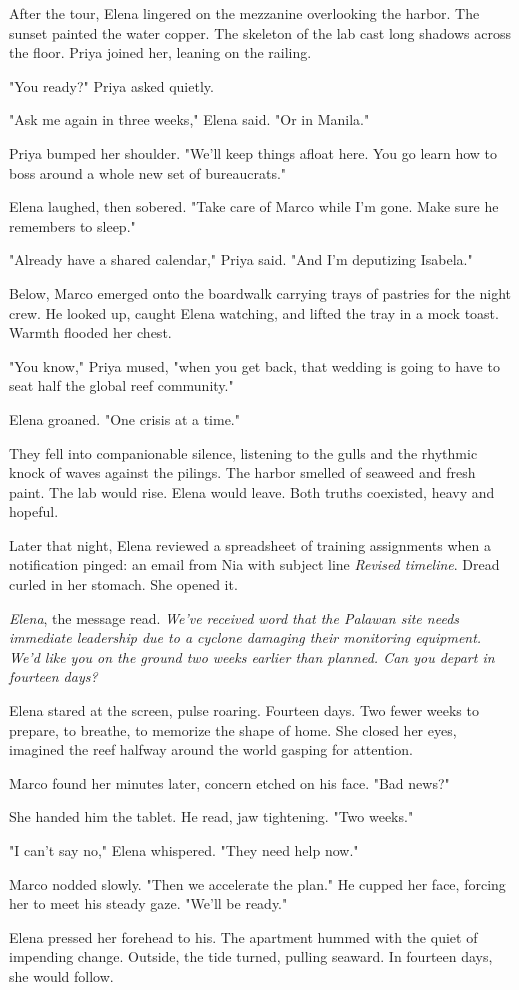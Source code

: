 After the tour, Elena lingered on the mezzanine overlooking the harbor. The sunset painted the water copper. The skeleton of the lab cast long shadows across the floor. Priya joined her, leaning on the railing.

"You ready?" Priya asked quietly.

"Ask me again in three weeks," Elena said. "Or in Manila."

Priya bumped her shoulder. "We'll keep things afloat here. You go learn how to boss around a whole new set of bureaucrats."

Elena laughed, then sobered. "Take care of Marco while I'm gone. Make sure he remembers to sleep."

"Already have a shared calendar," Priya said. "And I'm deputizing Isabela."

Below, Marco emerged onto the boardwalk carrying trays of pastries for the night crew. He looked up, caught Elena watching, and lifted the tray in a mock toast. Warmth flooded her chest.

"You know," Priya mused, "when you get back, that wedding is going to have to seat half the global reef community."

Elena groaned. "One crisis at a time."

They fell into companionable silence, listening to the gulls and the rhythmic knock of waves against the pilings. The harbor smelled of seaweed and fresh paint. The lab would rise. Elena would leave. Both truths coexisted, heavy and hopeful.

\bigskip

Later that night, Elena reviewed a spreadsheet of training assignments when a notification pinged: an email from Nia with subject line \textit{Revised timeline}. Dread curled in her stomach. She opened it.

\textit{Elena}, the message read. \textit{We've received word that the Palawan site needs immediate leadership due to a cyclone damaging their monitoring equipment. We'd like you on the ground two weeks earlier than planned. Can you depart in fourteen days?}

Elena stared at the screen, pulse roaring. Fourteen days. Two fewer weeks to prepare, to breathe, to memorize the shape of home. She closed her eyes, imagined the reef halfway around the world gasping for attention.

Marco found her minutes later, concern etched on his face. "Bad news?"

She handed him the tablet. He read, jaw tightening. "Two weeks."

"I can't say no," Elena whispered. "They need help now."

Marco nodded slowly. "Then we accelerate the plan." He cupped her face, forcing her to meet his steady gaze. "We'll be ready."

Elena pressed her forehead to his. The apartment hummed with the quiet of impending change. Outside, the tide turned, pulling seaward. In fourteen days, she would follow.
